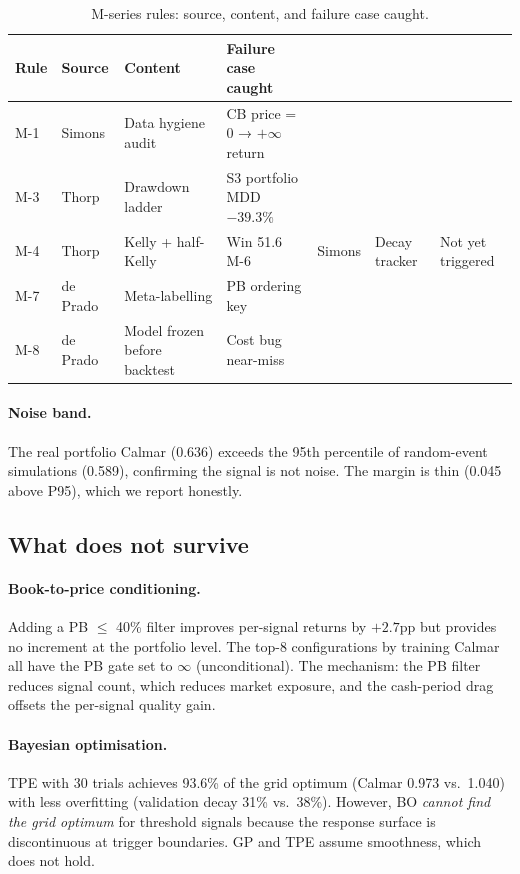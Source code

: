\documentclass[11pt]{article}
\begin{document}
\begin{table}[htbp]
\centering
\caption{M-series rules: source, content, and failure case caught.}
\label{tab:masters}
\small
\begin{tabular}{@{}lp{2.5cm}p{5cm}p{3cm}@{}}
\toprule
Rule & Source & Content & Failure case caught \\
\midrule
M-1 & Simons & Data hygiene audit & CB price = 0 → $+\infty$ return \\
M-3 & Thorp & Drawdown ladder & S3 portfolio MDD $-39.3\%$ \\
M-4 & Thorp & Kelly + half-Kelly & Win 51.6%
M-6 & Simons & Decay tracker & Not yet triggered \\
M-7 & de Prado & Meta-labelling & PB ordering key \\
M-8 & de Prado & Model frozen before backtest & Cost bug near-miss \\
\bottomrule
\end{tabular}
\end{table}

\paragraph{Noise band.}
The real portfolio Calmar (0.636) exceeds the 95th percentile of random-event
simulations (0.589), confirming the signal is not noise. The margin is thin
(0.045 above P95), which we report honestly.

\subsection{What does not survive}

\paragraph{Book-to-price conditioning.}
Adding a PB $\le$ 40\% filter improves per-signal returns by $+2.7$pp but
provides no increment at the portfolio level. The top-8 configurations by
training Calmar all have the PB gate set to $\infty$ (unconditional). The
mechanism: the PB filter reduces signal count, which reduces market exposure,
and the cash-period drag offsets the per-signal quality gain.

\paragraph{Bayesian optimisation.}
TPE with 30 trials achieves 93.6\% of the grid optimum (Calmar 0.973 vs.\
1.040) with less overfitting (validation decay 31\% vs.\ 38\%). However, BO
\emph{cannot find the grid optimum} for threshold signals because the
response surface is discontinuous at trigger boundaries. GP and TPE assume
smoothness, which does not hold.
\end{document}
